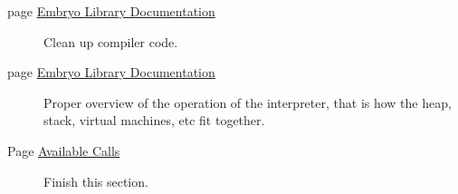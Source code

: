 \label{todo__todo000001}
\hypertarget{todo__todo000001}{}
 \begin{description}
\item[page \hyperlink{index}{Embryo Library Documentation} ]Clean up compiler code. \end{description}


\label{todo__todo000001}
\hypertarget{todo__todo000001}{}
 \begin{description}
\item[page \hyperlink{index}{Embryo Library Documentation} ]Proper overview of the operation of the interpreter, that is how the heap, stack, virtual machines, etc fit together. \end{description}


\label{todo__todo000003}
\hypertarget{todo__todo000003}{}
 \begin{description}
\item[Page \hyperlink{Available_Native_Calls_Page}{Available Calls} ]Finish this section.

\end{description}
